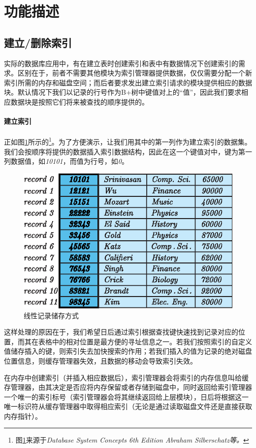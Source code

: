 \documentclass[UTF8]{ctexrep} %
\begin{document}
\section{功能描述}
\subsection{建立/删除索引}
实际的数据库应用中，有在建立表时创建索引和表中有数据情况下创建索引的需求。区别在于，前者不需要其他模块为索引管理器提供数据，仅仅需要分配一个新索引所需的内存和磁盘空间；而后者要求发出建立索引请求的模块提供相应的数据块。默认情况下我们以记录的行号作为B+树中键值对上的“值”，因此我们要求相应数据块是按照它们将来被查找的顺序提供的。
\paragraph{建立索引}
正如图\ref{fig:index_example}所示的\footnote{图\ref{fig:index_example}来源于\textit{Database System Concepts 6th Edition Abraham Silberschatz等。}}。为了方便演示，让我们用其中的第一列作为建立索引的数据集。我们会按顺序将提供的数据插入索引数据结构，因此在这一个键值对中，键为第一列数据值，如\textit{10101}，而值为行号，如\textit{0}。
\begin{figure}[H]
    \centering
    \includegraphics[width=0.7\linewidth]{figure/index_example.eps}
    \caption{线性记录储存方式}
    \label{fig:index_example}
\end{figure}

这样处理的原因在于，我们希望日后通过索引根据查找键快速找到记录对应的位置，而其在表格中的相对位置是最方便的寻址信息之一。若我们按照索引的自定义值储存插入的键，则索引失去加快搜索的作用；若我们插入的值为记录的绝对磁盘位置信息，则缓存管理器失效，且数据的移动会导致索引失效。
\par
在内存中创建索引（并插入相应数据后），索引管理器会将索引的内存信息叫给缓存管理器，由其决定是否应将内存保留或者存储到磁盘中，同时返回给索引管理器一个唯一的索引标号（索引管理器会将其继续返回给上层模块），日后将根据这一唯一标识符从缓存管理器中取得相应索引（无论是通过读取磁盘文件还是直接获取内存指针）。
\end{document}
